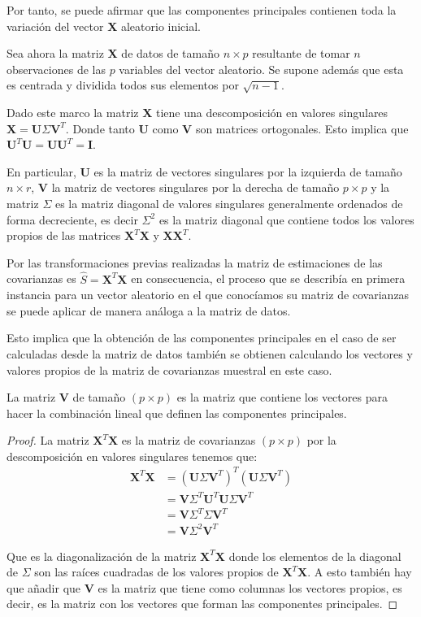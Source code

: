 \noindent Por tanto, se puede afirmar que las componentes principales contienen toda la variación del vector \textbf{X} aleatorio inicial.

\noindent Sea ahora la matriz \textbf{X} de datos de tamaño $n \times p$ resultante de tomar $n$ observaciones de las $p$ variables del vector aleatorio. Se supone además que esta es centrada y dividida todos sus elementos por $\sqrt{n-1}$. 

\noindent Dado este marco la matriz \textbf{X} tiene una descomposición en valores singulares $\textbf{X}=\textbf{U}\Sigma \textbf{V}^T$. Donde tanto \textbf{U} como $\textbf{V}$ son matrices ortogonales. Esto implica que $\textbf{U}^T \textbf{U}=\textbf{U}\textbf{U}^T=\textbf{I}$. 

\noindent  En particular, \textbf{U} es la matriz de vectores singulares por la izquierda  de tamaño $n \times r$, \textbf{V} la matriz de vectores singulares por la derecha de tamaño $p \times p$ y la matriz $\Sigma$ es la matriz diagonal de valores singulares generalmente ordenados de forma decreciente, es decir $\Sigma^2$ es la matriz diagonal que contiene todos los valores propios de las matrices $\textbf{X}^T\textbf{X}$ y $\textbf{X}\textbf{X}^T$.

\noindent Por las transformaciones previas realizadas la matriz de estimaciones de las covarianzas es $\hat{S}=\textbf{X}^T\textbf{X}$ en consecuencia, el proceso que se describía en primera instancia para un vector aleatorio en el que conocíamos su matriz de covarianzas se puede aplicar de manera análoga a la matriz de datos.

\noindent Esto implica que la obtención de las componentes principales en el caso de ser calculadas desde la matriz de datos también se obtienen calculando los vectores y valores propios de la matriz de covarianzas muestral en este caso. 

\begin{propo}
La matriz \textbf{V} de tamaño $(p\times p)$ es la matriz que contiene los vectores para hacer la combinación lineal que definen las componentes principales.
\begin{proof}
La matriz $\textbf{X}^T \textbf{X}$ es la matriz de covarianzas $(p \times p)$  por la descomposición en valores singulares tenemos que:
\begin{align*}
\textbf{X}^T \textbf{X} &= (\textbf{U}\Sigma \textbf{V}^T)^T (\textbf{U}\Sigma \textbf{V}^T)\\
&= \textbf{V}\Sigma ^T \textbf{U}^T \textbf{U}\Sigma \textbf{V}^T\\
&= \textbf{V}\Sigma ^T \Sigma \textbf{V}^T \\
&=  \textbf{V}\Sigma ^2  \textbf{V}^T 
\end{align*}

\noindent Que es la diagonalización de la matriz $\textbf{X}^T \textbf{X}$ donde los elementos de la diagonal de $\Sigma$ son las raíces cuadradas de los valores propios de $\textbf{X}^T \textbf{X}$. A esto también hay que añadir que \textbf{V} es la matriz que tiene como columnas los vectores propios, es decir, es la matriz con los vectores que forman las componentes principales. 
\end{proof}
\end{propo}

